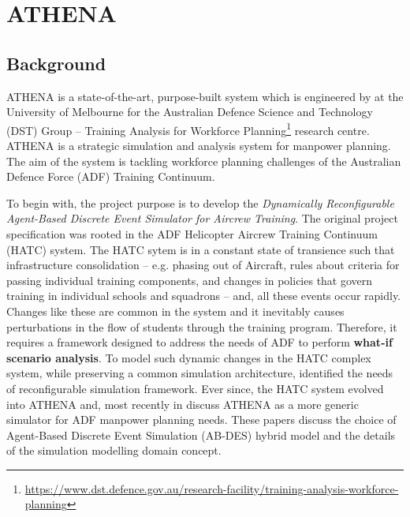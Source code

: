 \chapter{ATHENA} 

\label{Chapter2}

\section{Background}

ATHENA is a state-of-the-art, purpose-built system which is engineered by \textit{\groupname} at the University of Melbourne for the Australian Defence Science and Technology (DST) Group -- Training Analysis for Workforce Planning\footnote{\url{https://www.dst.defence.gov.au/research-facility/training-analysis-workforce-planning}} research centre. ATHENA is a strategic simulation and analysis system for manpower planning. The aim of the system is tackling workforce planning challenges of the Australian Defence Force (ADF) Training Continuum. 

To begin with, the project purpose is to develop the \textit{Dynamically Reconfigurable Agent-Based Discrete Event Simulator for Aircrew Training}. The original project specification was rooted in the ADF Helicopter Aircrew Training Continuum (HATC) system. The HATC\parencite{HATC} sytem is in a constant state of transience such that infrastructure consolidation -- e.g. phasing out of Aircraft, rules about criteria for passing individual training components, and changes in policies that govern training in individual schools and squadrons -- and, all these events occur rapidly. Changes like these are common in the system and it inevitably causes perturbations in the flow of students through the training program. Therefore, it requires a framework designed to address the needs of ADF to perform \textbf{what-if scenario analysis}. To model such dynamic changes in the HATC complex system, while preserving a common simulation architecture, \parencite{HATC} identified the needs of reconfigurable simulation framework. Ever since, the HATC system evolved into ATHENA and, most recently in \parencite{8248116} discuss ATHENA as a more generic simulator for ADF manpower planning needs. 
These papers discuss the choice of Agent-Based Discrete Event Simulation (AB-DES) hybrid model and the details of the simulation modelling domain concept.

